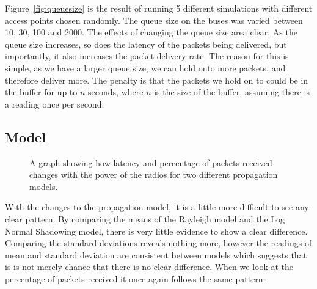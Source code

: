\documentclass[12pt,a4paper,notitlepage]{article}
\begin{document}
Figure~\ref{fig:queuesize} is the result of running 5 different simulations with different access points chosen randomly. The queue size on the buses was varied between 10, 30, 100 and 2000. The effects of changing the queue size area clear. As the queue size increases, so does the latency of the packets being delivered, but importantly, it also increases the packet delivery rate. The reason for this is simple, as we have a larger queue size, we can hold onto more packets, and therefore deliver more. The penalty is that the packets we hold on to could be in the buffer for up to $n$ seconds, where $n$ is the size of the buffer, assuming there is a reading once per second.

\subsection{Model}

\begin{figure}[H]
    \begin{center}
        \caption{A graph showing how latency and percentage of packets received changes with the power of the radios for two different propagation models.}
        \label{fig:radiopower}
    \end{center}
\end{figure}


With the changes to the propagation model, it is a little more difficult to see any clear pattern. By comparing the means of the Rayleigh model and the Log Normal Shadowing model, there is very little evidence to show a clear difference. Comparing the standard deviations reveals nothing more, however the readings of mean and standard deviation are consistent between models which suggests that is is not merely chance that there is no clear difference. When we look at the percentage of packets received it once again follows the same pattern. 
\end{document}
